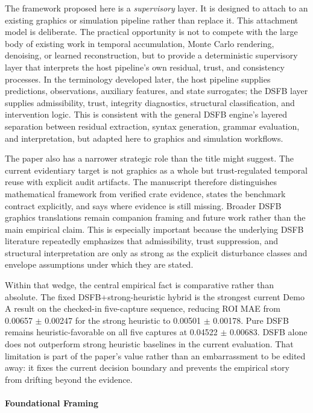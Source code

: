 \documentclass[11pt,letterpaper]{article}
\theoremstyle{gcresult}
\theoremstyle{definition}
\begin{document}
The framework proposed here is a \emph{supervisory} layer. It is designed to attach to an existing graphics or simulation pipeline rather than replace it. This attachment model is deliberate. The practical opportunity is not to compete with the large body of existing work in temporal accumulation, Monte Carlo rendering, denoising, or learned reconstruction, but to provide a deterministic supervisory layer that interprets the host pipeline's own residual, trust, and consistency processes. In the terminology developed later, the host pipeline supplies predictions, observations, auxiliary features, and state surrogates; the DSFB layer supplies admissibility, trust, integrity diagnostics, structural classification, and intervention logic. This is consistent with the general DSFB engine’s layered separation between residual extraction, syntax generation, grammar evaluation, and interpretation, but adapted here to graphics and simulation workflows. 

The paper also has a narrower strategic role than the title might suggest. The current evidentiary target is not graphics as a whole but trust-regulated temporal reuse with explicit audit artifacts. The manuscript therefore distinguishes mathematical framework from verified crate evidence, states the benchmark contract explicitly, and says where evidence is still missing. Broader DSFB graphics translations remain companion framing and future work rather than the main empirical claim. This is especially important because the underlying DSFB literature repeatedly emphasizes that admissibility, trust suppression, and structural interpretation are only as strong as the explicit disturbance classes and envelope assumptions under which they are stated. 

Within that wedge, the central empirical fact is comparative rather than absolute. The fixed DSFB+strong-heuristic hybrid is the strongest current Demo A result on the checked-in five-capture sequence, reducing ROI MAE from 0.00657 $\pm$ 0.00247 for the strong heuristic to 0.00501 $\pm$ 0.00178. Pure DSFB remains heuristic-favorable on all five captures at 0.04522 $\pm$ 0.00683. DSFB alone does not outperform strong heuristic baselines in the current evaluation. That limitation is part of the paper's value rather than an embarrassment to be edited away: it fixes the current decision boundary and prevents the empirical story from drifting beyond the evidence.


\paragraph{Foundational Framing}
\end{document}
